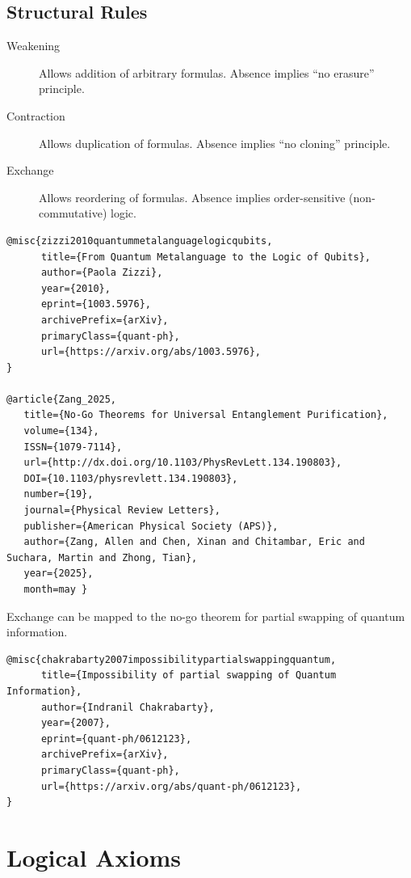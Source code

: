 \subsection*{Structural Rules}

\begin{description}
    \item[Weakening] Allows addition of arbitrary formulas. Absence implies ``no erasure'' principle.
    \item[Contraction] Allows duplication of formulas. Absence implies ``no cloning'' principle.
    \item[Exchange] Allows reordering of formulas. Absence implies order-sensitive (non-commutative) logic.
\end{description}

\begin{verbatim}
@misc{zizzi2010quantummetalanguagelogicqubits,
      title={From Quantum Metalanguage to the Logic of Qubits}, 
      author={Paola Zizzi},
      year={2010},
      eprint={1003.5976},
      archivePrefix={arXiv},
      primaryClass={quant-ph},
      url={https://arxiv.org/abs/1003.5976}, 
}

@article{Zang_2025,
   title={No-Go Theorems for Universal Entanglement Purification},
   volume={134},
   ISSN={1079-7114},
   url={http://dx.doi.org/10.1103/PhysRevLett.134.190803},
   DOI={10.1103/physrevlett.134.190803},
   number={19},
   journal={Physical Review Letters},
   publisher={American Physical Society (APS)},
   author={Zang, Allen and Chen, Xinan and Chitambar, Eric and Suchara, Martin and Zhong, Tian},
   year={2025},
   month=may }
\end{verbatim}
   
Exchange can be mapped to the no-go theorem for partial swapping of quantum information.

\begin{verbatim}
@misc{chakrabarty2007impossibilitypartialswappingquantum,
      title={Impossibility of partial swapping of Quantum Information}, 
      author={Indranil Chakrabarty},
      year={2007},
      eprint={quant-ph/0612123},
      archivePrefix={arXiv},
      primaryClass={quant-ph},
      url={https://arxiv.org/abs/quant-ph/0612123}, 
}
\end{verbatim}

\section*{Logical Axioms}

